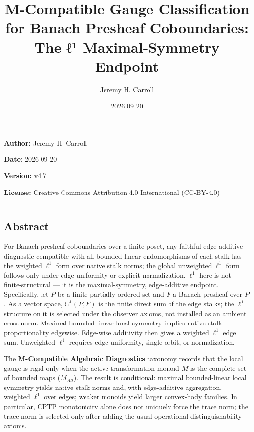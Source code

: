 \documentclass[
  11pt,
]{article}
\title{M-Compatible Gauge Classification for Banach Presheaf Coboundaries: The ℓ¹ Maximal-Symmetry Endpoint}
\author{Jeremy H. Carroll}
\date{2026-09-20}
\begin{document}
\maketitle

{
\hypersetup{linkcolor=}
\setcounter{tocdepth}{2}
\tableofcontents
}
\textbf{Author:} Jeremy H. Carroll

\textbf{Date:} 2026-09-20

\textbf{Version:} v4.7

\textbf{License:} Creative Commons Attribution 4.0 International (CC-BY-4.0)

\begin{center}\rule{0.5\linewidth}{0.5pt}\end{center}

\subsection{Abstract}\label{abstract}

For Banach-presheaf coboundaries over a finite poset, any faithful edge-additive diagnostic compatible with all bounded linear endomorphisms of each stalk has the weighted \(\ell^1\) form over native stalk norms; the global unweighted \(\ell^1\) form follows only under edge-uniformity or explicit normalization. \(\ell^1\) here is not finite-structural --- it is the maximal-symmetry, edge-additive endpoint. Specifically, let \(P\) be a finite partially ordered set and \(F\) a Banach presheaf over \(P\). As a vector space, \(C^1(P,F)\) is the finite direct sum of the edge stalks; the \(\ell^1\) structure on it is selected under the observer axioms, not installed as an ambient cross-norm. Maximal bounded-linear local symmetry implies native-stalk proportionality edgewise. Edge-wise additivity then gives a weighted \(\ell^1\) edge sum. Unweighted \(\ell^1\) requires edge-uniformity, single orbit, or normalization.

The \textbf{M-Compatible Algebraic Diagnostics} taxonomy records that the local gauge is rigid only when the active transformation monoid \(M\) is the complete set of bounded maps (\(M_{All}\)). The result is conditional: maximal bounded-linear local symmetry yields native stalk norms and, with edge-additive aggregation, weighted \(\ell^1\) over edges; weaker monoids yield larger convex-body families. In particular, CPTP monotonicity alone does not uniquely force the trace norm; the trace norm is selected only after adding the usual operational distinguishability axioms.
\end{document}
